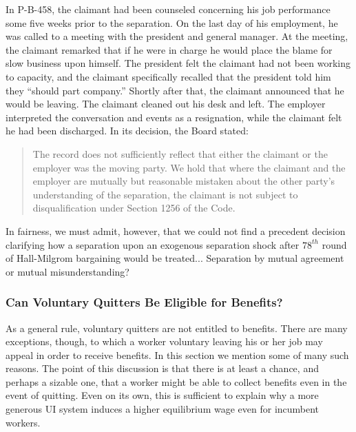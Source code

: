 \documentclass[12pt]{article}
\newcommand{\1}{\mathbf{1}}
\begin{document}
\begin{appendix}
In P-B-458, the claimant had been counseled concerning his job performance some five weeks prior to the separation. On the last day of his employment, he was called to a meeting with the president and general manager. At the meeting, the claimant remarked that if he were in charge he would place the blame for slow business upon himself. The president felt the claimant had not been working to capacity, and the claimant specifically recalled that the president told him they ``should part company.'' Shortly after that, the claimant announced that he would be leaving. The claimant cleaned out his desk and left. The employer interpreted the conversation and events as a resignation, while the claimant felt he had been discharged. In its decision, the Board stated:
\begin{quotation}
The record does not sufficiently reflect that either the claimant or the employer was the moving party. We hold that where the claimant and the employer are mutually but reasonable mistaken about the other party's understanding of the separation, the claimant is not subject to disqualification under Section 1256 of the Code.
\end{quotation}

 In fairness, we must admit, however, that we could not find a precedent decision clarifying how a separation upon an exogenous separation shock after $78^{th}$ round of Hall-Milgrom bargaining would be treated... Separation by mutual agreement or mutual misunderstanding?



\subsubsection{Can Voluntary Quitters Be Eligible for Benefits?}
\label{app:eligible_quitters}

As a general rule, voluntary quitters are not entitled to benefits. There are many exceptions, though, to which a worker voluntary leaving his or her job may appeal in order to receive benefits. In this section we mention some of many such reasons. The point of this discussion is that there is at least a chance, and perhaps a sizable one, that a worker might be able to collect benefits even in the event of quitting. Even on its own, this is sufficient to explain why a more generous UI system induces a higher equilibrium wage even for incumbent workers.

\begin{enumerate}


\end{enumerate}
\end{appendix}
\end{document}
